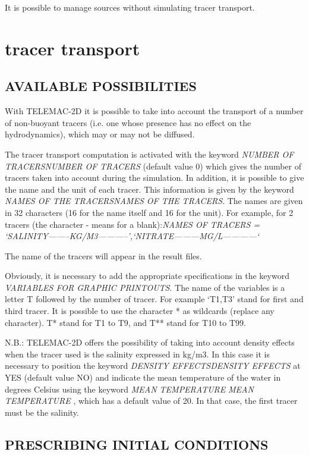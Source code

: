 \documentclass{article} %
\begin{document}
 It is possible to manage sources without simulating tracer transport.




\section{  tracer transport}


\subsection{ AVAILABLE POSSIBILITIES}

 With TELEMAC-2D it is possible to take into account the transport of a number of non-buoyant tracers (i.e. one whose presence has no effect on the hydrodynamics), which may or may not be diffused.

 The tracer transport computation is activated with the keyword \textit{NUMBER OF TRACERSNUMBER OF TRACERS} (default value 0) which gives the number of tracers taken into account during the simulation. In addition, it is possible to give the name and the unit of each tracer. This information is given by the keyword \textit{NAMES OF THE TRACERSNAMES OF THE TRACERS}. The names are given in 32 characters (16 for the name itself and 16 for the unit). For example, for 2 tracers (the character - means for a blank):\textit{NAMES OF TRACERS = `SALINITY--------KG/M3-----------',`NITRATE---------MG/L------------`}

 The name of the tracers will appear in the result files.

 Obviously, it is necessary to add the appropriate specifications in the keyword \textit{VARIABLES FOR GRAPHIC PRINTOUTS}. The name of the variables is a letter T followed by the number of tracer. For example `T1,T3' stand for first and third tracer. It is possible to use the character * as wildcards (replace any character). T* stand for T1 to T9, and T** stand for T10 to T99.

 N.B.: TELEMAC-2D offers the possibility of taking into account density effects when the tracer used is the salinity expressed in kg/m3. In this case it is necessary to position the keyword \textit{DENSITY EFFECTSDENSITY EFFECTS} at YES (default value NO) and indicate the mean temperature of the water in degrees Celsius using the keyword \textit{MEAN TEMPERATURE} \textit{MEAN TEMPERATURE }, which has a default value of 20. In that case, the first tracer must be the salinity.


\subsection{ PRESCRIBING INITIAL CONDITIONS}
\end{document}

